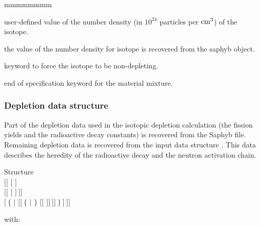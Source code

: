 \begin{ListeDeDescription}{mmmmmmmm}
\item[\dusa{conc}] user-defined value of the number density (in $10^{24}$ particles per ${\rm cm}^3$) of the isotope.

\item[\moc{*}] the value of the number density for isotope  is recovered from the {\sc saphyb} object.

\item[\moc{NOEV}] keyword to force the isotope  to be non-depleting.

\item[\moc{ENDMIX}] end of specification keyword for the material mixture.

\end{ListeDeDescription}

\subsubsection{Depletion data structure}\label{sect:descdepld}

Part of the depletion data used in the isotopic depletion calculation (the fission yields and the
radioactive decay constants) is recovered from the Saphyb file. Remaining depletion data is
recovered from the input data structure . This data describes the heredity of the radioactive decay
and the neutron activation chain.

\begin{DataStructure}{Structure }
 \\
\hskip 0.3cm $[[$  $[$  $]$ \\
\hskip 0.6cm $[[$  $[$  $]~]]$ \\
\hskip 0.6cm $[~\{$  $|$  $[[~\{$  $|$  $\}$
$[[$   $]]~]]~\}~]~]]$\\
\end{DataStructure}

\noindent
with:

